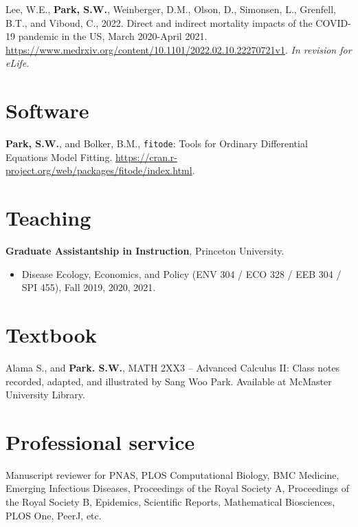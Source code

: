 \documentclass[11pt]{article} %
\begin{document}
 Lee, W.E., \textbf{Park, S.W.}, Weinberger, D.M., Olson, D., Simonsen, L., Grenfell, B.T., and Viboud, C., 2022. Direct and indirect mortality impacts of the COVID-19 pandemic in the US, March 2020-April 2021. \url{https://www.medrxiv.org/content/10.1101/2022.02.10.22270721v1}. \textit{In revision for eLife}.\\

\section*{Software}

 \textbf{Park, S.W.}, and Bolker, B.M., \texttt{fitode}: Tools for Ordinary Differential Equations Model Fitting. \url{https://cran.r-project.org/web/packages/fitode/index.html}.

\section*{Teaching}

 \textbf{Graduate Assistantship in Instruction}, Princeton University.
\begin{itemize}
  \item Disease Ecology, Economics, and Policy (ENV 304 / ECO 328 / EEB 304 / SPI 455), Fall 2019, 2020, 2021.
\end{itemize}

\section*{Textbook}

 Alama S., and \textbf{Park. S.W.}, MATH 2XX3 -- Advanced Calculus II: Class notes recorded, adapted, and illustrated by Sang Woo Park. Available at McMaster University Library.

\section*{Professional service}

Manuscript reviewer for PNAS, PLOS Computational Biology, BMC Medicine, Emerging Infectious Diseases, Proceedings of the Royal Society A, Proceedings of the Royal Society B, Epidemics, Scientific Reports, Mathematical Biosciences, PLOS One, PeerJ, etc.

\end{document}
